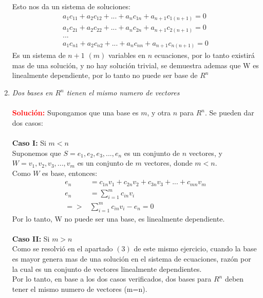 \documentclass[12pt]{article}
\begin{document}
\begin{enumerate}
Esto nos da un sistema de soluciones:
\begin {equation*} \begin {split}
a_{1}c_{11} + a_{2}c_{12} + ... + a_{n}c_{1n} + a_{n+1}c_{1(n+1)} = 0 \\ 
a_{1}c_{21} + a_{2}c_{22} + ... + a_{n}c_{2n} + a_{n+1}c_{2(n+1)} = 0 \\
... \\
a_{1}c_{n1} + a_{2}c_{n2} + ... + a_{n}c_{nn} + a_{n+1}c_{n(n+1)} = 0 
\end {split} \end {equation*}
Es un sistema de $n+1$ $(m)$ variables en $n$ ecuaciones, por lo tanto existirá mas de una solución, y no hay solución trivial, se demuestra ademas que W es linealmente dependiente, por lo tanto no puede ser base de $R^{n}$  \\

\item \textit{Dos bases en $R^{n}$ tienen el mismo numero de vectores} \\\\
\noindent \textcolor{red}{\bf Solución:}
Supongamos que una base es $m$, y otra $n$ para $R^{n}$. Se pueden dar dos casos: \\ \\
\textbf{Caso I:} Si $m < n$ \\ 
 Suponemos que $S = {e_{1},e_{2},e_{3}, ..., e_{n}}$ es un conjunto de $n$ vectores, y $W={v_{1},v_{2},v_{3}, ..., v_{m}}$ es un conjunto de $m$ vectores, donde $m<n$. \\
 Como $W$ es base, entonces:
 \begin {equation*} \begin {split}
 e_{n} &= c_{1n}v_{1} + c_{2n}v_{2} + c_{3n}v_{3} + ... + c_{mn}v_{m} \\
 e_{n} &= \sum_{i=1}^{m}c_{in}v_{i} \\ 
 => & \sum_{i=1}^{m}c_{in}v_{i} -  e_{n} = 0
 \end {split} \end {equation*}
 Por lo tanto, W no puede ser una base, es linealmente dependiente. \\ \\
 \textbf{Caso II:} Si $m>n$ \\
 Como se resolvió en el apartado $(3)$ de este mismo ejercicio, cuando la base es mayor genera mas de una solución en el sistema de ecuaciones, razón por la cual es un conjunto de vectores linealmente dependientes. \\
 Por lo tanto, en base a los dos casos verificados, dos bases para $R^{n}$ deben tener el mismo numero de vectores (m=n).\\ 
 

\end{enumerate}
\end{document}
